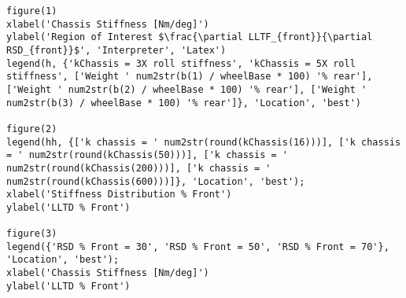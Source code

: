 \begin{lstlisting}
figure(1)
xlabel('Chassis Stiffness [Nm/deg]')
ylabel('Region of Interest $\frac{\partial LLTF_{front}}{\partial RSD_{front}}$', 'Interpreter', 'Latex')
legend(h, {'kChassis = 3X roll stiffness', 'kChassis = 5X roll stiffness', ['Weight ' num2str(b(1) / wheelBase * 100) '% rear'], ['Weight ' num2str(b(2) / wheelBase * 100) '% rear'], ['Weight ' num2str(b(3) / wheelBase * 100) '% rear']}, 'Location', 'best')

figure(2)
legend(hh, {['k chassis = ' num2str(round(kChassis(16)))], ['k chassis = ' num2str(round(kChassis(50)))], ['k chassis = ' num2str(round(kChassis(200)))], ['k chassis = ' num2str(round(kChassis(600)))]}, 'Location', 'best');
xlabel('Stiffness Distribution % Front')
ylabel('LLTD % Front')

figure(3)
legend({'RSD % Front = 30', 'RSD % Front = 50', 'RSD % Front = 70'}, 'Location', 'best');
xlabel('Chassis Stiffness [Nm/deg]')
ylabel('LLTD % Front')
\end{lstlisting}